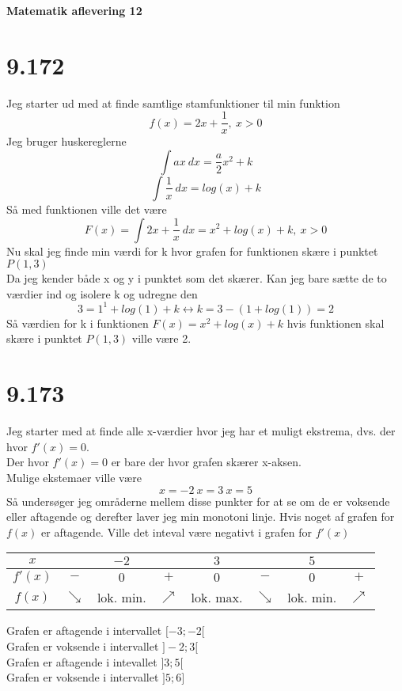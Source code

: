 \documentclass[12pt]{article}
\begin{document}
\Large{\textbf{Matematik aflevering 12}}
\normalsize

\section{9.172}
Jeg starter ud med at finde samtlige stamfunktioner til min funktion
$$f(x)=2x+\frac{1}{x}, \ x > 0$$
Jeg bruger huskereglerne
$$\int ax \ dx = \frac{a}{2}x^2+k$$
$$\int \frac{1}{x} \ dx = log(x)+k$$
Så med funktionen ville det være
$$F(x)=\int 2x+\frac{1}{x} \ dx = x^2+log(x)+k, \ x > 0$$
Nu skal jeg finde min værdi for k hvor grafen for funktionen skære i punktet $P(1,3)$\\
Da jeg kender både x og y i punktet som det skærer. Kan jeg bare sætte de to værdier ind og isolere k og udregne den
$$3=1^1+log(1)+k \leftrightarrow k = 3 - (1 + log(1))=2$$
Så værdien for k i funktionen $F(x)=x^2+log(x)+k$ hvis funktionen skal skære i punktet $P(1,3)$ ville være 2.

\section{9.173}
Jeg starter med at finde alle x-værdier hvor jeg har et muligt ekstrema, dvs. der hvor $f'(x)=0$.\\
Der hvor $f'(x)=0$ er bare der hvor grafen skærer x-aksen.\\
Mulige ekstemaer ville være
$$x = -2 \ x = 3 \ x = 5$$
Så undersøger jeg områderne mellem disse punkter for at se om de er voksende eller aftagende
og derefter laver jeg min monotoni linje. Hvis noget af grafen for $f(x)$ er aftagende. Ville det inteval være negativt i grafen for $f'(x)$

\begin{center}
  \begin{tabular}{c c c c c c c c}
        $x$ & & $-2$ & & $3$ & & $5$ &\\
        \hline
        $f'(x)$ & $-$ & $0$ & $+$ & $0$ & $-$ & $0$ & $+$\\
        $f(x)$ & $\searrow$ & lok. min. & $\nearrow$ & lok. max. & $\searrow$ & lok. min. & $\nearrow$\\
  \end{tabular}
\end{center}
Grafen er aftagende i intervallet $[-3;-2[$\\
Grafen er voksende i intervallet $]-2;3[$\\
Grafen er aftagende i intevallet $]3;5[$\\
Grafen er voksende i intervallet $]5;6]$
\end{document}
